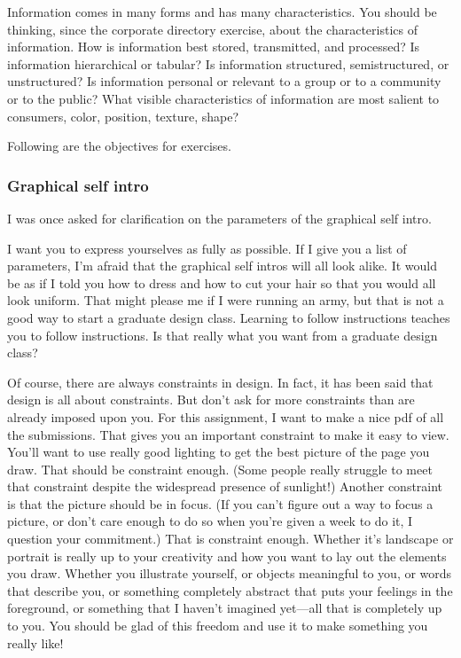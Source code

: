 Information comes in many forms and has many characteristics. You should
be thinking, since the corporate directory exercise, about the
characteristics of information. How is information best stored,
transmitted, and processed? Is information hierarchical or tabular? Is
information structured, semistructured, or unstructured? Is information
personal or relevant to a group or to a community or to the public? What
visible characteristics of information are most salient to consumers,
color, position, texture, shape?

\hypertarget{exercise-objectives}{%
\label{exercise-objectives}}

Following are the objectives for exercises.

\hypertarget{graphical-self-intro}{%
\subsubsection{Graphical self intro}\label{graphical-self-intro}}

I was once asked for clarification on the parameters of the graphical
self intro.

I want you to express yourselves as fully as possible. If I give you a
list of parameters, I'm afraid that the graphical self intros will all
look alike. It would be as if I told you how to dress and how to cut
your hair so that you would all look uniform. That might please me if I
were running an army, but that is not a good way to start a graduate
design class. Learning to follow instructions teaches you to follow
instructions. Is that really what you want from a graduate design class?

Of course, there are always constraints in design. In fact, it has been
said that design is all about constraints. But don't ask for more
constraints than are already imposed upon you. For this assignment, I
want to make a nice pdf of all the submissions. That gives you an
important constraint to make it easy to view. You'll want to use really
good lighting to get the best picture of the page you draw. That should
be constraint enough. (Some people really struggle to meet that
constraint despite the widespread presence of sunlight!) Another
constraint is that the picture should be in focus. (If you can't figure
out a way to focus a picture, or don't care enough to do so when you're
given a week to do it, I question your commitment.) That is constraint
enough. Whether it's landscape or portrait is really up to your
creativity and how you want to lay out the elements you draw. Whether
you illustrate yourself, or objects meaningful to you, or words that
describe you, or something completely abstract that puts your feelings
in the foreground, or something that I haven't imagined yet---all that
is completely up to you. You should be glad of this freedom and use it
to make something you really like!

